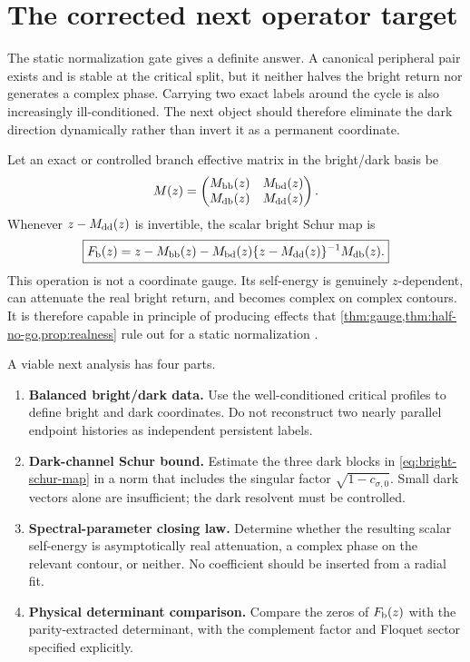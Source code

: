 \documentclass[11pt]{article}
\theoremstyle{definition}
\theoremstyle{remark}
\begin{document}
\section{The corrected next operator target}
\label{sec:next-target}

The static normalization gate gives a definite answer.  A canonical
peripheral pair exists and is stable at the critical split, but it neither
halves the bright return nor generates a complex phase.  Carrying two exact
labels around the cycle is also increasingly ill-conditioned.  The next
object should therefore eliminate the dark direction dynamically rather
than invert it as a permanent coordinate.

Let an exact or controlled branch effective matrix in the bright/dark basis
be
\begin{equation}\label{eq:z-effective-matrix}
 M(z)=
 \begin{pmatrix}
 M_{\rm bb}(z)&M_{\rm bd}(z)\\
 M_{\rm db}(z)&M_{\rm dd}(z)
 \end{pmatrix}.
\end{equation}
Whenever $z-M_{\rm dd}(z)$ is invertible, the scalar bright Schur map is
\begin{equation}\label{eq:bright-schur-map}
 \boxed{
 F_{\rm b}(z)
 =z-M_{\rm bb}(z)
 -M_{\rm bd}(z)
 \{z-M_{\rm dd}(z)\}^{-1}
 M_{\rm db}(z).}
\end{equation}
This operation is not a coordinate gauge.  Its self-energy is genuinely
$z$-dependent, can attenuate the real bright return, and becomes complex on
complex contours.  It is therefore capable in principle of producing
effects that \cref{thm:gauge,thm:half-no-go,prop:realness} rule out for a
static normalization \citep{SjoestrandZworski2007}.

A viable next analysis has four parts.
\begin{enumerate}[label=\textbf{D\arabic*.},leftmargin=3.1em]
 \item \textbf{Balanced bright/dark data.}
 Use the well-conditioned critical profiles to define bright and dark
 coordinates.  Do not reconstruct two nearly parallel endpoint histories
 as independent persistent labels.

 \item \textbf{Dark-channel Schur bound.}
 Estimate the three dark blocks in \eqref{eq:bright-schur-map} in a norm that
 includes the singular factor $\sqrt{1-c_{\sigma,0}}$.  Small dark vectors
 alone are insufficient; the dark resolvent must be controlled.

 \item \textbf{Spectral-parameter closing law.}
 Determine whether the resulting scalar self-energy is asymptotically real
 attenuation, a complex phase on the relevant contour, or neither.  No
 coefficient should be inserted from a radial fit.

 \item \textbf{Physical determinant comparison.}
 Compare the zeros of $F_{\rm b}(z)$ with the parity-extracted determinant,
 with the complement factor and Floquet sector specified explicitly.
\end{enumerate}
\end{document}
